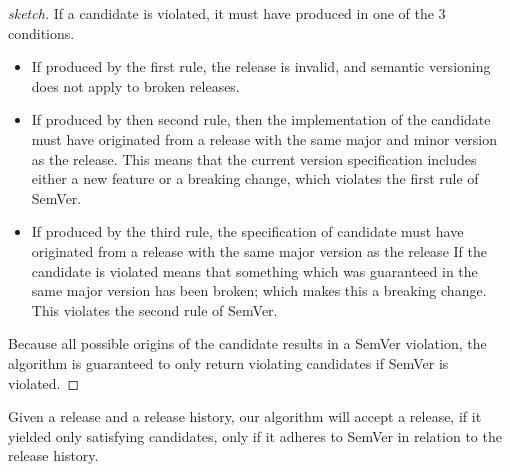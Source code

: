 \begin{proof}[sketch]
If a candidate is violated, it must have produced in one of the 3 conditions. 
\begin{itemize}
\item If produced by the first rule, the release is invalid, and semantic
  versioning does not apply to broken releases. 
\item If produced by then second rule, then the implementation of the
  candidate must have originated from a release with the same major and 
  minor version as the release. This means that the current version
  specification includes either a new feature or a breaking change,
  which violates the first rule of SemVer.
\item If produced by the third rule, the specification of candidate must
  have originated from a release with the same major version as the release
  If the candidate is violated means that something which was guaranteed
  in the same major version has been broken; which makes this a breaking
  change. This violates the second rule of SemVer.
\end{itemize}
Because all possible origins of the candidate results in a SemVer
violation, the algorithm is guaranteed to only return violating
candidates if SemVer is violated.
\end{proof}

\begin{theorem}[Completness]
Given a release and a release history, our algorithm will accept a
release, if it yielded only satisfying candidates, only if it adheres to
SemVer in relation to the release history.
\end{theorem}

